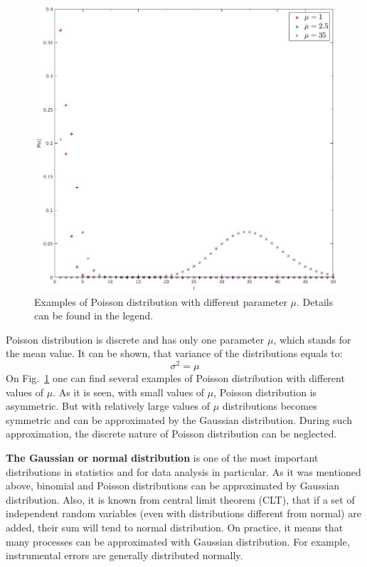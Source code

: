 \documentclass[12pt,a4paper]{report}
\begin{document}
\begin{figure}[!h]
\begin{center}
\includegraphics*[scale = 0.4]{Figures/Poisson}
\caption{\label{fig:Poisson} Examples of Poisson distribution with different parameter $\mu$. Details can be found in the legend.}
\end{center}
\end{figure}
Poisson distribution is discrete and has only one parameter $\mu$, which stands for the mean value. It can be shown, that variance of the distributions equals to:
\begin{equation*}
\sigma^2 = \mu 
\end{equation*}
On Fig.~\ref{fig:Poisson} one can find several examples of Poisson distribution with different values of $\mu$. As it is seen, with small values of $\mu$, Poisson distribution is asymmetric. But with relatively large values of $\mu$ distributions becomes symmetric and can be approximated by the Gaussian distribution. During such approximation, the discrete nature of Poisson distribution can be neglected.  \par
\textbf{The Gaussian or normal distribution} is one of the most important distributions in statistics and for data analysis in particular. As it was mentioned above, binomial and Poisson distributions can be approximated by Gaussian distribution. Also, it is known from central limit theorem (CLT), that if a set of independent random variables (even with distributions different from normal) are added, their sum will tend to normal distribution. On practice, it means that many processes can be approximated with Gaussian distribution. For example, instrumental errors are generally distributed normally.
\end{document}
